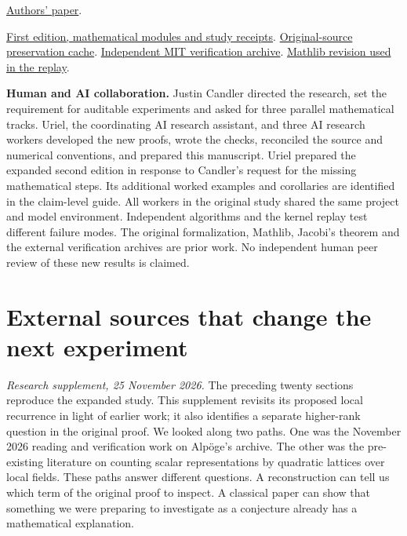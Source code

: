 \documentclass[12pt,letterpaper]{article}
\begin{document}
\href{https://people.math.carleton.ca/~aalaca/pubs/aa2007-6.pdf}{Authors' paper}.
\par
\href{https://github.com/nousentllc/riemann-hypothesis/tree/3f39c057bb593d610473bd9d477cad518a6ba21c/research/uriel/experiments/uncapped-growth}{First edition, mathematical modules and study receipts}.
\href{https://github.com/homeowmorphism/riemann-hypothesis-original/blob/main/verification/CACHE.md}{Original-source preservation cache}.
\href{https://math.mit.edu/~drew/grh/}{Independent MIT verification archive}.
\href{https://github.com/leanprover-community/mathlib4/tree/0df444a360eaa60ab8c11dca51a86af692955474}{Mathlib revision used in the replay}.
\par
\textbf{Human and AI collaboration.} Justin Candler directed the research, set the requirement for auditable experiments and asked for three parallel mathematical tracks. Uriel, the coordinating AI research assistant, and three AI research workers developed the new proofs, wrote the checks, reconciled the source and numerical conventions, and prepared this manuscript. Uriel prepared the expanded second edition in response to Candler’s request for the missing mathematical steps. Its additional worked examples and corollaries are identified in the claim-level guide. All workers in the original study shared the same project and model environment. Independent algorithms and the kernel replay test different failure modes. The original formalization, Mathlib, Jacobi's theorem and the external verification archives are prior work. No independent human peer review of these new results is claimed.
\clearpage\section{External sources that change the next experiment}\label{sec:scout}
\textit{Research supplement, 25 November 2026.} The preceding twenty sections reproduce the expanded study. This supplement revisits its proposed local recurrence in light of earlier work; it also identifies a separate higher-rank question in the original proof. We looked along two paths. One was the November 2026 reading and verification work on Alpöge's archive. The other was the pre-existing literature on counting scalar representations by quadratic lattices over local fields. These paths answer different questions. A reconstruction can tell us which term of the original proof to inspect. A classical paper can show that something we were preparing to investigate as a conjecture already has a mathematical explanation.
\end{document}
